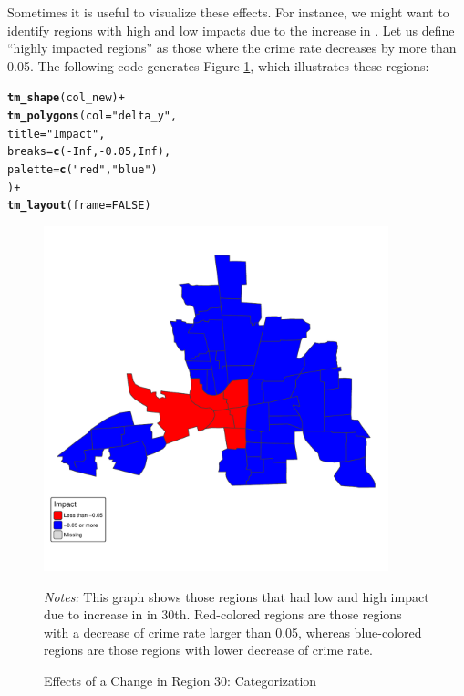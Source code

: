 \documentclass[english,12pt]{book}\usepackage[]{graphicx}\usepackage[]{xcolor}
\makeatletter
\newcommand{\hlnum}[1]{\textcolor[rgb]{0.686,0.059,0.569}{#1}}%
\newcommand{\hlsng}[1]{\textcolor[rgb]{0.192,0.494,0.8}{#1}}%
\newcommand{\hlopt}[1]{\textcolor[rgb]{0,0,0}{#1}}%
\newcommand{\hldef}[1]{\textcolor[rgb]{0.345,0.345,0.345}{#1}}%
\newcommand{\hlkwc}[1]{\textcolor[rgb]{0.333,0.667,0.333}{#1}}%
\newcommand{\hlkwd}[1]{\textcolor[rgb]{0.737,0.353,0.396}{\textbf{#1}}}%
\newenvironment{kframe}{%
 \def\at@end@of@kframe{}%
 \ifinner\ifhmode%
  \def\at@end@of@kframe{\end{minipage}}%
  \begin{minipage}{\columnwidth}%
 \fi\fi%
 \def\FrameCommand##1{\hskip\@totalleftmargin \hskip-\fboxsep
 \colorbox{shadecolor}{##1}\hskip-\fboxsep
     \hskip-\linewidth \hskip-\@totalleftmargin \hskip\columnwidth}%
 \MakeFramed {\advance\hsize-\width
   \@totalleftmargin\z@ \linewidth\hsize
   \@setminipage}}%
 {\par\unskip\endMakeFramed%
 \at@end@of@kframe}
\newenvironment{knitrout}{}{} %
\makeatother
\begin{document}
Sometimes it is useful to visualize these effects. For instance, we might want to identify regions with high and low impacts due to the increase in . Let us define ``highly impacted regions'' as those where the crime rate decreases by more than 0.05. The following code generates Figure \ref{fig:predicted-effect}, which illustrates these regions:

\begin{knitrout}
\color{fgcolor}\begin{kframe}
\begin{alltt}
\hlkwd{tm_shape}\hldef{(col_new)} \hlopt{+}
  \hlkwd{tm_polygons}\hldef{(}\hlkwc{col} \hldef{=} \hlsng{"delta_y"}\hldef{,}
              \hlkwc{title} \hldef{=} \hlsng{"Impact"}\hldef{,}
              \hlkwc{breaks} \hldef{=} \hlkwd{c}\hldef{(}\hlopt{-}\hlnum{Inf}\hldef{,}\hlopt{-}\hlnum{0.05}\hldef{,} \hlnum{Inf}\hldef{),}
              \hlkwc{palette} \hldef{=} \hlkwd{c}\hldef{(}\hlsng{"red"}\hldef{,} \hlsng{"blue"}\hldef{)}
              \hldef{)} \hlopt{+}
  \hlkwd{tm_layout}\hldef{(}\hlkwc{frame} \hldef{=} \hlnum{FALSE}\hldef{)}
\end{alltt}
\end{kframe}
\end{knitrout}


\begin{figure}[ht]
  \caption{Effects of a Change in Region 30: Categorization}
    \label{fig:predicted-effect}
    \centering 
	\begin{minipage}{.9\linewidth}
\begin{knitrout}
\color{fgcolor}

{\centering \includegraphics[width=10cm,height=10cm]{figure/predicted-effect-1} 

}


\end{knitrout}
\footnotesize
		\emph{Notes:} This graph shows those regions that had low and high impact due to increase in  in 30th. Red-colored regions are those regions with a decrease of crime rate larger than 0.05, whereas blue-colored regions are those regions with lower decrease of crime rate. 
	\end{minipage}	
\end{figure}
\end{document}
